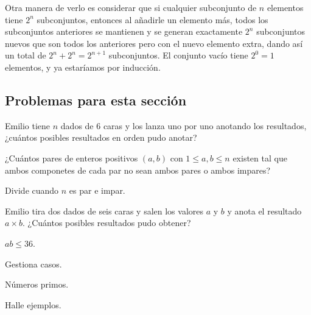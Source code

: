 \begin{remark}
	Otra manera de verlo es considerar que
	si cualquier subconjunto de $n$ elementos
	tiene $2^n$ subconjuntos, entonces
	al añadirle un elemento más, todos los subconjuntos
	anteriores se mantienen y se generan exactamente $2^n$
	subconjuntos nuevos que son todos los anteriores pero
	con el nuevo elemento extra, dando así un total de
	$2^n + 2^n = 2^{n + 1}$ subconjuntos.
	El conjunto vacío tiene $2^0 = 1$ elementos,
	y ya estaríamos por inducción.
\end{remark}

\subsection*{Problemas para esta sección}
\begin{problem}
Emilio tiene $n$ dados de $6$ caras
y los lanza uno por uno anotando
los resultados, ¿cuántos
posibles resultados
en orden pudo anotar?
\end{problem}

\begin{problem}
¿Cuántos pares
de enteros positivos $(a, b)$
con $1 \leq a, b \leq n$ existen
tal que ambos componetes de cada par no sean
ambos pares o ambos impares?

\begin{hints}
	\begin{hint}
		Divide cuando $n$ es par e impar.
	\end{hint}
\end{hints}
\end{problem}

\begin{problem}
Emilio tira dos dados de seis caras
y salen los valores $a$ y $b$
y anota el resultado $a \times b$.
¿Cuántos posibles resultados pudo obtener?

\begin{hints}
	\begin{hint}
		$ab \leq 36$.
	\end{hint}

	\begin{hint}
		Gestiona casos.
	\end{hint}

	\begin{hint}
		Números primos.
	\end{hint}

	\begin{hint}
		Halle ejemplos.
	\end{hint}
\end{hints}
\end{problem}


